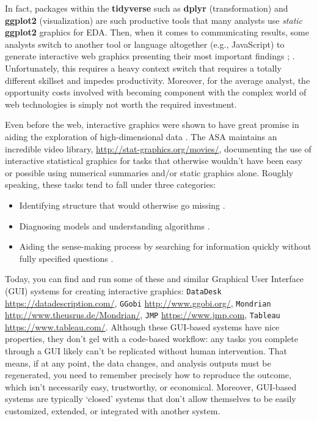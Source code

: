 \documentclass[
  12pt,
]{krantz}
\providecommand{\tightlist}{%
  \setlength{\itemsep}{0pt}\setlength{\parskip}{0pt}}
\begin{document}
In fact, packages within the \textbf{tidyverse} such as \textbf{dplyr} (transformation) and \textbf{ggplot2} (visualization) are such productive tools that many analysts use \emph{static} \textbf{ggplot2} graphics for EDA. Then, when it comes to communicating results, some analysts switch to another tool or language altogether (e.g., JavaScript) to generate interactive web graphics presenting their most important findings \citep{flowingdata-r}; \citep{nyt-r}. Unfortunately, this requires a heavy context switch that requires a totally different skillset and impedes productivity. Moreover, for the average analyst, the opportunity costs involved with becoming component with the complex world of web technologies is simply not worth the required investment.

Even before the web, interactive graphics were shown to have great promise in aiding the exploration of high-dimensional data \citep{Cook:2007uk}. The ASA maintains an incredible video library, \url{http://stat-graphics.org/movies/}, documenting the use of interactive statistical graphics for tasks that otherwise wouldn't have been easy or possible using numerical summaries and/or static graphics alone. Roughly speaking, these tasks tend to fall under three categories:

\begin{itemize}
\tightlist
\item
  Identifying structure that would otherwise go missing \citep{prim9}.
\item
  Diagnosing models and understanding algorithms \citep{model-vis-paper}.
\item
  Aiding the sense-making process by searching for information quickly without fully specified questions \citep{Unwin:1999vp}.
\end{itemize}

Today, you can find and run some of these and similar Graphical User Interface (GUI) systems for creating interactive graphics: \texttt{DataDesk} \url{https://datadescription.com/}, \texttt{GGobi} \url{http://www.ggobi.org/}, \texttt{Mondrian} \url{http://www.theusrus.de/Mondrian/}, \texttt{JMP} \url{https://www.jmp.com}, \texttt{Tableau} \url{https://www.tableau.com/}. Although these GUI-based systems have nice properties, they don't gel with a code-based workflow: any tasks you complete through a GUI likely can't be replicated without human intervention. That means, if at any point, the data changes, and analysis outputs must be regenerated, you need to remember precisely how to reproduce the outcome, which isn't necessarily easy, trustworthy, or economical. Moreover, GUI-based systems are typically `closed' systems that don't allow themselves to be easily customized, extended, or integrated with another system.
\end{document}
